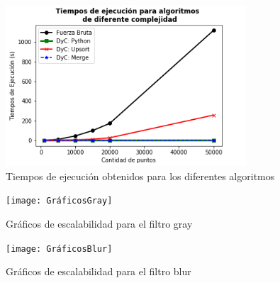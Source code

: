 \documentclass[12pt,a4paper]{article}
\begin{document}
\begin{figure}
  \centering
    \includegraphics[width=0.8\textwidth]{GraficosEj1}
  \caption{Tiempos de ejecución obtenidos para los diferentes       algoritmos}
  \label{fig:ejemplo}
\end{figure}


\begin{figure}
  \centering
    \texttt{[image: GráficosGray]}
  \caption{Gráficos de escalabilidad para el filtro gray}
  \label{fig:ejemplo}
\end{figure}


\begin{figure}
  \centering
    \texttt{[image: GráficosBlur]}
  \caption{Gráficos de escalabilidad para el filtro blur}
  \label{fig:ejemplo}
\end{figure}
\end{document}
